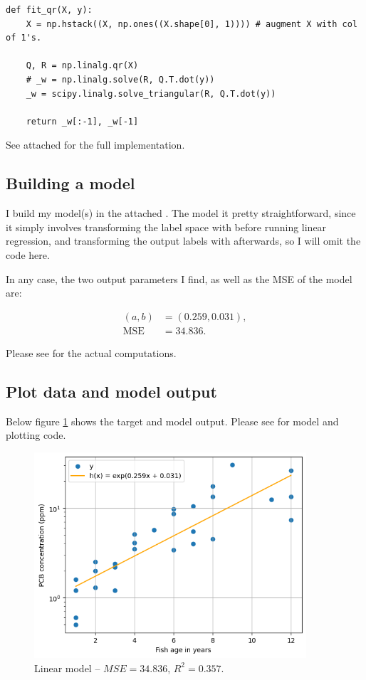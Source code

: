 \begin{verbatim}
def fit_qr(X, y):
    X = np.hstack((X, np.ones((X.shape[0], 1)))) # augment X with col of 1's.

    Q, R = np.linalg.qr(X)
    # _w = np.linalg.solve(R, Q.T.dot(y))
    _w = scipy.linalg.solve_triangular(R, Q.T.dot(y))

    return _w[:-1], _w[-1]
\end{verbatim}

See attached  for the full implementation.

\subsection{Building a model}
I build my model(s) in the attached . The model it pretty
straightforward, since it simply involves transforming the label space with
 before running linear regression, and transforming the output
labels with  afterwards, so I will omit the code here.

In any case, the two output parameters I find, as well as the MSE of the model
are:

\begin{align*}
  (a, b) &= (0.259, 0.031),\\
  \text{MSE} &= 34.836.
\end{align*}

Please see  for the actual computations.


\newpage
\subsection{Plot data and model output}
Below figure \ref{fig:3-3} shows the target and model output. Please see
 for model and plotting code.

\begin{figure}[H]
  \includegraphics[width=0.9\textwidth]{figures/fig3_3.png}
\caption{Linear model -- $MSE = 34.836$, $R^2 = 0.357$.}
\label{fig:3-3}
\end{figure}

